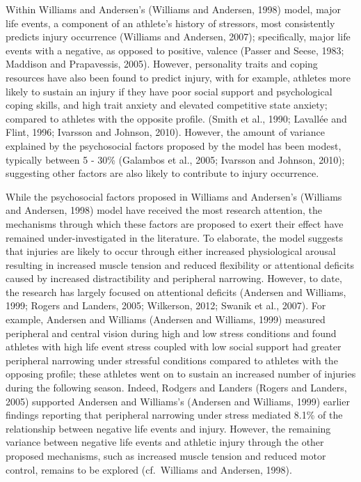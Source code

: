 \documentclass[utf8]{frontiersHLTH}
\begin{document}
Within Williams and Andersen's (Williams and Andersen, 1998) model,
major life events, a component of an athlete's history of stressors,
most consistently predicts injury occurrence (Williams and Andersen,
2007); specifically, major life events with a negative, as opposed to
positive, valence (Passer and Seese, 1983; Maddison and Prapavessis,
2005). However, personality traits and coping resources have also been
found to predict injury, with for example, athletes more likely to
sustain an injury if they have poor social support and psychological
coping skills, and high trait anxiety and elevated competitive state
anxiety; compared to athletes with the opposite profile. (Smith et al.,
1990; Lavallée and Flint, 1996; Ivarsson and Johnson, 2010). However,
the amount of variance explained by the psychosocial factors proposed by
the model has been modest, typically between 5 - 30\% (Galambos et al.,
2005; Ivarsson and Johnson, 2010); suggesting other factors are also
likely to contribute to injury occurrence.

While the psychosocial factors proposed in Williams and Andersen's
(Williams and Andersen, 1998) model have received the most research
attention, the mechanisms through which these factors are proposed to
exert their effect have remained under-investigated in the literature.
To elaborate, the model suggests that injuries are likely to occur
through either increased physiological arousal resulting in increased
muscle tension and reduced flexibility or attentional deficits caused by
increased distractibility and peripheral narrowing. However, to date,
the research has largely focused on attentional deficits (Andersen and
Williams, 1999; Rogers and Landers, 2005; Wilkerson, 2012; Swanik et
al., 2007). For example, Andersen and Williams (Andersen and Williams,
1999) measured peripheral and central vision during high and low stress
conditions and found athletes with high life event stress coupled with
low social support had greater peripheral narrowing under stressful
conditions compared to athletes with the opposing profile; these
athletes went on to sustain an increased number of injuries during the
following season. Indeed, Rodgers and Landers (Rogers and Landers, 2005)
supported Andersen and Williams's (Andersen and Williams, 1999) earlier
findings reporting that peripheral narrowing under stress mediated 8.1\%
of the relationship between negative life events and injury. However,
the remaining variance between negative life events and athletic injury
through the other proposed mechanisms, such as increased muscle tension
and reduced motor control, remains to be explored (cf.~Williams and
Andersen, 1998).
\end{document}
